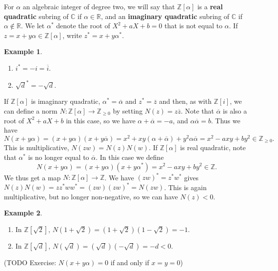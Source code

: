 \documentclass{article}
\newcommand{\Z}{\mathbb{Z}}
\newcommand{\R}{\mathbb{R}}
\newcommand{\C}{\mathbb{C}}
\newcommand{\rb}[1]{\left( #1 \right)}
\renewcommand{\sb}[1]{\left[ #1 \right]}
\theoremstyle{definition}\newtheorem{definition}{Definition}
\theoremstyle{definition}\newtheorem{remark}[definition]{Remark}
\theoremstyle{definition}\newtheorem*{example}{Example}
\theoremstyle{definition}\newtheorem*{note}{Note}
\begin{document}
For $ \alpha $ an algebraic integer of degree two, we will say that $ \Z\sb{\alpha} $ is a \textbf{real quadratic} subring of $ \C $ if $ \alpha \in \R $, and an \textbf{imaginary quadratic} subring of $ \C $ if $ \alpha \notin \R $. We let $ \alpha^* $ denote the root of $ X^2 + aX + b = 0 $ that is not equal to $ \alpha $. If $ z = x + y\alpha \in \Z\sb{\alpha} $, write $ z^* = x + y\alpha^* $.

\begin{example}
\hfill
\begin{enumerate}
\item $ i^* = -i = \overline{i} $.
\item $ \sqrt{d}^* = -\sqrt{d} $.
\end{enumerate}
\end{example}

If $ \Z\sb{\alpha} $ is imaginary quadratic, $ \alpha^* = \overline{\alpha} $ and $ z^* = \overline{z} $ and then, as with $ \Z\sb{i} $, we can define a norm $ N : \Z\sb{\alpha} \to \Z_{\ge 0} $ by setting $ N\rb{z} = z\overline{z} $. Note that $ \overline{\alpha} $ is also a root of $ X^2 + aX + b $ in this case, so we have $ \alpha + \overline{\alpha} = -a $, and $ \alpha\overline{\alpha} = b $. Thus we have
$$ N\rb{x + y\alpha} = \rb{x + y\alpha}\rb{x + y\overline{\alpha}} = x^2 + xy\rb{\alpha + \overline{\alpha}} + y^2\alpha\overline{\alpha} = x^2 - axy + by^2 \in \Z_{\ge 0}. $$
This is multiplicative, $ N\rb{zw} = N\rb{z}N\rb{w} $. If $ \Z\sb{\alpha} $ is real quadratic, note that $ \alpha^* $ is no longer equal to $ \overline{\alpha} $. In this case we define
$$ N\rb{x + y\alpha} = \rb{x + y\alpha}\rb{x + y\alpha^*} = x^2 - axy + by^2 \in \Z. $$
We thus get a map $ N : \Z\sb{\alpha} \to \Z $. We have $ \rb{zw}^* = z^*w^* $ gives $ N\rb{z}N\rb{w} = zz^*ww^* = \rb{zw}\rb{zw}^* = N\rb{zw} $. This is again multiplicative, but no longer non-negative, so we can have $ N\rb{z} < 0 $.

\begin{example}
\hfill
\begin{enumerate}
\item In $ \Z\sb{\sqrt{2}} $, $ N\rb{1 + \sqrt{2}} = \rb{1 + \sqrt{2}}\rb{1 - \sqrt{2}} = -1 $.
\item In $ \Z\sb{\sqrt{d}} $, $ N\rb{\sqrt{d}} = \rb{\sqrt{d}}\rb{-\sqrt{d}} = -d < 0 $.
\end{enumerate}
\end{example}

(TODO Exercise: $ N\rb{x + y\alpha} = 0 $ if and only if $ x = y = 0 $)
\end{document}
